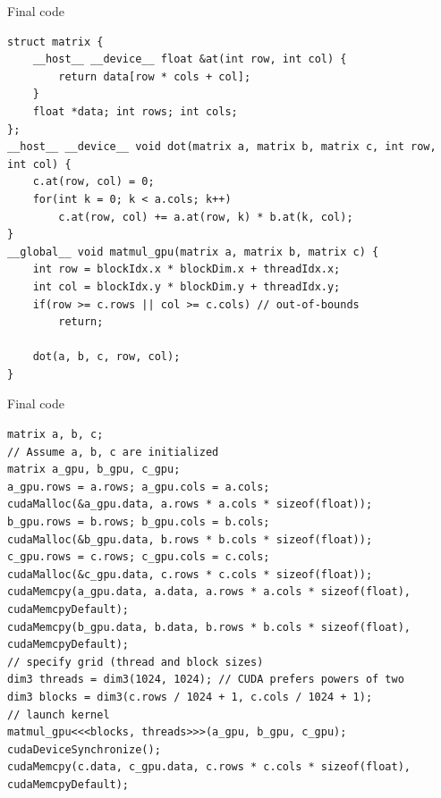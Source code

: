 \begin{frame}[fragile]{Final code}
    \begin{verbatim}
struct matrix {
    __host__ __device__ float &at(int row, int col) {
        return data[row * cols + col];
    }
    float *data; int rows; int cols;
};
__host__ __device__ void dot(matrix a, matrix b, matrix c, int row, int col) {
    c.at(row, col) = 0;
    for(int k = 0; k < a.cols; k++)
        c.at(row, col) += a.at(row, k) * b.at(k, col);
}
__global__ void matmul_gpu(matrix a, matrix b, matrix c) {
    int row = blockIdx.x * blockDim.x + threadIdx.x;
    int col = blockIdx.y * blockDim.y + threadIdx.y;
    if(row >= c.rows || col >= c.cols) // out-of-bounds
        return;

    dot(a, b, c, row, col);
}
    \end{verbatim}
\end{frame}

\begin{frame}[fragile]{Final code}
    \begin{verbatim}
matrix a, b, c;
// Assume a, b, c are initialized
matrix a_gpu, b_gpu, c_gpu;
a_gpu.rows = a.rows; a_gpu.cols = a.cols;
cudaMalloc(&a_gpu.data, a.rows * a.cols * sizeof(float));
b_gpu.rows = b.rows; b_gpu.cols = b.cols;
cudaMalloc(&b_gpu.data, b.rows * b.cols * sizeof(float));
c_gpu.rows = c.rows; c_gpu.cols = c.cols;
cudaMalloc(&c_gpu.data, c.rows * c.cols * sizeof(float));
cudaMemcpy(a_gpu.data, a.data, a.rows * a.cols * sizeof(float), cudaMemcpyDefault);
cudaMemcpy(b_gpu.data, b.data, b.rows * b.cols * sizeof(float), cudaMemcpyDefault);
// specify grid (thread and block sizes)
dim3 threads = dim3(1024, 1024); // CUDA prefers powers of two
dim3 blocks = dim3(c.rows / 1024 + 1, c.cols / 1024 + 1);
// launch kernel
matmul_gpu<<<blocks, threads>>>(a_gpu, b_gpu, c_gpu);
cudaDeviceSynchronize();
cudaMemcpy(c.data, c_gpu.data, c.rows * c.cols * sizeof(float), cudaMemcpyDefault);
    \end{verbatim}
\end{frame}